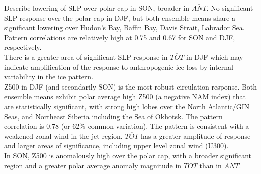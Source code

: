 \documentclass[twocol]{ametsoc}
\begin{document}
Describe lowering of SLP over polar cap in SON, broader in $\overline{ANT}$. No significant SLP response over the polar cap in DJF, but both ensemble means share a significant lowering over Hudon's Bay, Baffin Bay, Davis Strait, Labrador Sea. Pattern correlations are relatively high at 0.75 and 0.67 for SON and DJF, respectively.\\
There is a greater area of significant SLP response in $\overline{TOT}$ in DJF which may indicate amplification of the response to anthropogenic ice loss by internal variability in the ice pattern.\\
Z500 in DJF (and secondarily SON) is the most robust circulation response. Both ensemble means exhibit polar average high Z500 (a negative NAM index) that are statistically significant, with strong high lobes over the North Atlantic/GIN Seas, and Northeast Siberia including the Sea of Okhotsk. The pattern correlation is 0.78 (or 62\% common variation). The pattern is consistent with a weakened zonal wind in the jet region. $\overline{TOT}$ has a greater amplitude of response and larger areas of significance, including upper level zonal wind (U300). \\
In SON, Z500 is anomalously high over the polar cap, with a broader significant region and a greater polar average anomaly magnitude in $\overline{TOT}$ than in $\overline{ANT}$. \\
\end{document}

